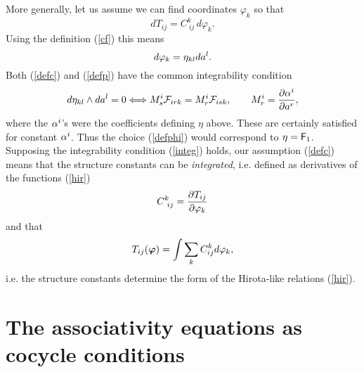 \documentclass[a4paper,]{article}
\def\d{\partial}
\def\Bf#1{\mbox{\boldmath $#1$}}
\def\F{{\cal F}}
\def\f{{\sf F}}
\begin{document}
More generally, let us assume we can find coordinates $\varphi_k$ so that
\begin{equation}
\label{defc}
dT_{ij}=C^k_{\ ij}\,d\varphi_k.
\end{equation}
Using the definition (\ref{cf}) this means
\begin{equation}
\label{defp}
d\varphi_k=\eta_{kl}d a\sp{l}.
\end{equation}
Both (\ref{defc}) and (\ref{defp}) have the common integrability condition
\begin{equation}
\label{integ}
d\eta_{kl}\wedge d a\sp{l}=0\Longleftrightarrow M\sp{i}_s \F_{irk}=
M\sp{i}_r \F_{isk} ,\qquad M\sp{i}_r=\dfrac{\d \alpha\sp{i}}{\d a\sp{r}},
\end{equation}
where the $\alpha\sp{i}$'s were the coefficients defining $\eta$ above.
These are certainly satisfied for constant $\alpha\sp{i}$. Thus the
choice (\ref{defphi}) would correspond to $\eta=\f_1$.
Supposing the integrability condition (\ref{integ}) holds, our assumption 
(\ref{defc}) means that the structure constants can be {\em integrated}, i.e.
defined as derivatives of the functions (\ref{hir})
\begin{equation}
\label{c}
C_{\ ij}^k = {\d T_{ij}\over\d\varphi_k}
\end{equation}
and that
\begin{equation}
\label{inthir}
T_{ij}({\Bf\varphi}) = \int \sum_k C_{ij}^k d\varphi_k,
\end{equation}
i.e. the structure constants determine the form of the Hirota-like
relations (\ref{hir}).

\section{The associativity equations as cocycle conditions}
\end{document}

